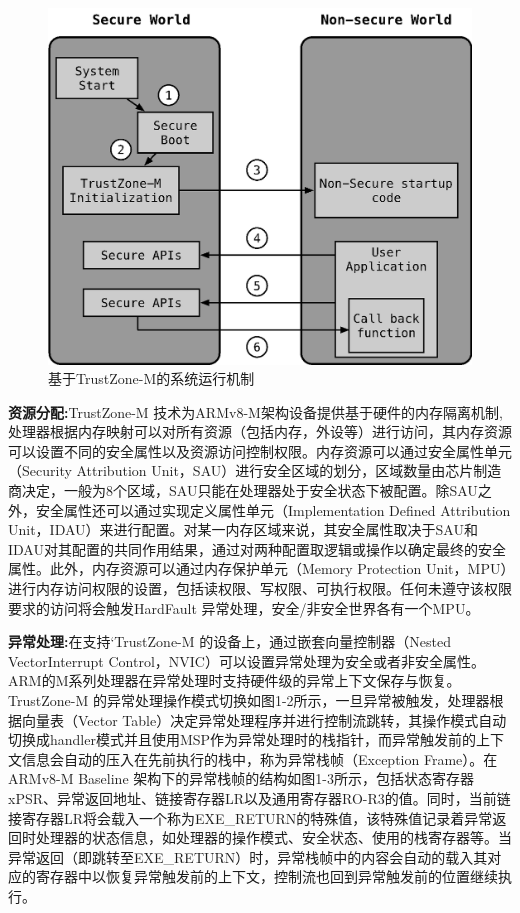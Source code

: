\documentclass[12pt,a4paper]{ctexart}
\begin{document}
\begin{figure}[h]
    \centering
    \includegraphics[scale=0.5]{graph/2.png}
    \caption{基于TrustZone-M的系统运行机制}
\end{figure}
\par \textbf{资源分配:}TrustZone-M 技术为ARMv8-M架构设备提供基于硬件的内存隔离机制,处理器根据内存映射可以对所有资源（包括内存，外设等）进行访问，其内存资源可以设置不同的安全属性以及资源访问控制权限。内存资源可以通过安全属性单元（Security Attribution Unit，SAU）进行安全区域的划分，区域数量由芯片制造商决定，一般为8个区域，SAU只能在处理器处于安全状态下被配置。除SAU之外，安全属性还可以通过实现定义属性单元（Implementation Defined Attribution Unit，IDAU）来进行配置。对某一内存区域来说，其安全属性取决于SAU和IDAU对其配置的共同作用结果，通过对两种配置取逻辑或操作以确定最终的安全属性。此外，内存资源可以通过内存保护单元（Memory Protection Unit，MPU）进行内存访问权限的设置，包括读权限、写权限、可执行权限。任何未遵守该权限要求的访问将会触发HardFault 异常处理，安全/非安全世界各有一个MPU。
\par \textbf{异常处理:}在支持‘TrustZone-M 的设备上，通过嵌套向量控制器（Nested VectorInterrupt Control，NVIC）可以设置异常处理为安全或者非安全属性。ARM的M系列处理器在异常处理时支持硬件级的异常上下文保存与恢复。TrustZone-M 的异常处理操作模式切换如图1-2所示，一旦异常被触发，处理器根据向量表（Vector Table）决定异常处理程序并进行控制流跳转，其操作模式自动切换成handler模式并且使用MSP作为异常处理时的栈指针，而异常触发前的上下文信息会自动的压入在先前执行的栈中，称为异常栈帧（Exception Frame）。在ARMv8-M Baseline 架构下的异常栈帧的结构如图1-3所示，包括状态寄存器xPSR、异常返回地址、链接寄存器LR以及通用寄存器RO-R3的值。同时，当前链接寄存器LR将会载入一个称为EXE\_RETURN的特殊值，该特殊值记录着异常返回时处理器的状态信息，如处理器的操作模式、安全状态、使用的栈寄存器等。当异常返回（即跳转至EXE\_RETURN）时，异常栈帧中的内容会自动的载入其对应的寄存器中以恢复异常触发前的上下文，控制流也回到异常触发前的位置继续执行。\\
\end{document}
